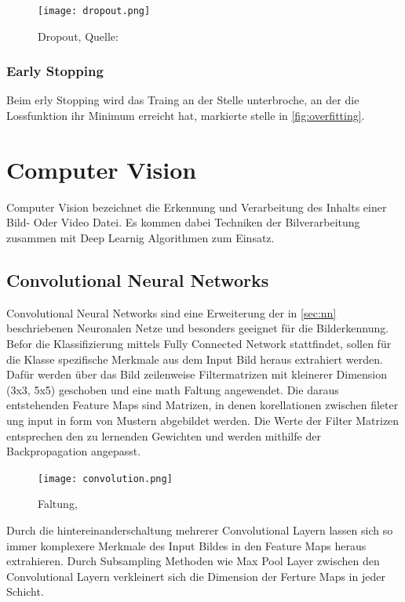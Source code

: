 \begin{figure}[H]
    \centering
    \texttt{[image: dropout.png]}
    \caption{Dropout, Quelle: \cite{maksutovDeepStudyNot2018}}
    \label{fig:dropout}
\end{figure}

\subsubsection{Early Stopping}
Beim erly Stopping wird das Traing an der 
Stelle unterbroche, an der die Lossfunktion ihr 
Minimum erreicht hat, markierte stelle in 
\ref{fig:overfitting}.



\section{Computer Vision}

Computer Vision bezeichnet die Erkennung und 
Verarbeitung des Inhalts einer Bild- Oder Video 
Datei. Es kommen dabei Techniken der Bilverarbeitung
zusammen mit Deep Learnig Algorithmen zum Einsatz.


\subsection{Convolutional Neural Networks}\label{subsec:cnn}

Convolutional Neural Networks sind eine Erweiterung 
der in \ref{sec:nn} beschriebenen Neuronalen Netze 
und besonders geeignet für die Bilderkennung.
Befor die Klassifizierung mittels Fully Connected Network 
stattfindet, sollen für die Klasse spezifische Merkmale 
aus dem Input Bild heraus extrahiert werden.
Dafür werden über das Bild zeilenweise Filtermatrizen mit kleinerer Dimension
(3x3, 5x5) geschoben und eine math Faltung angewendet.
Die daraus entstehenden Feature Maps sind Matrizen, in denen 
korellationen zwischen fileter ung input in form von 
Mustern abgebildet werden.
Die Werte der Filter Matrizen entsprechen den zu lernenden Gewichten 
und werden mithilfe der Backpropagation angepasst.

\begin{figure}[H]
    \centering
    \label{fig:conv}
    \texttt{[image: convolution.png]}
    \caption{Faltung, \cite{researcherSimpleIntroductionConvolutional2019}}
\end{figure}


Durch die hintereinanderschaltung mehrerer Convolutional Layern 
lassen sich so immer komplexere Merkmale des Input Bildes in den 
Feature Maps heraus extrahieren.
Durch Subsampling Methoden wie Max Pool Layer zwischen den Convolutional
Layern verkleinert sich die Dimension der Ferture Maps in jeder Schicht.



